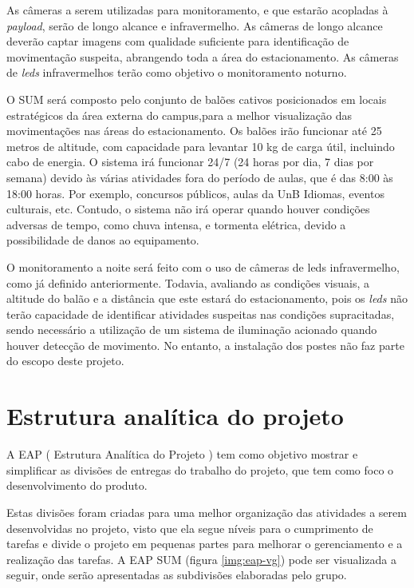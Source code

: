   As câmeras a serem utilizadas para monitoramento, e que estarão acopladas à \emph{payload}, serão de longo alcance e infravermelho.  As câmeras de longo alcance deverão captar imagens com qualidade suficiente para identificação de movimentação suspeita, abrangendo toda a área do estacionamento. As câmeras de \emph{leds} infravermelhos terão como objetivo o monitoramento noturno.

  O SUM será composto pelo conjunto de balões cativos posicionados em locais estratégicos da área externa do campus,para a melhor visualização das movimentações nas áreas do estacionamento. Os balões irão funcionar até 25 metros de altitude, com capacidade para levantar 10 kg de carga útil, incluindo cabo de energia. O sistema irá funcionar 24/7 (24 horas por dia, 7 dias por semana) devido às várias atividades fora do período de aulas, que é das 8:00 às 18:00 horas. Por exemplo, concursos públicos, aulas da UnB Idiomas, eventos culturais, etc. Contudo, o sistema não irá operar quando houver condições adversas de tempo, como chuva intensa, e tormenta elétrica, devido a possibilidade de danos ao equipamento.

  O monitoramento a noite será feito com o uso de câmeras de leds infravermelho, como já definido anteriormente. Todavia, avaliando as condições visuais, a altitude do balão e a distância que este estará do estacionamento, pois os \emph{leds} não terão capacidade  de identificar atividades suspeitas nas condições supracitadas, sendo necessário a utilização de um sistema de iluminação acionado quando houver detecção de movimento. No entanto, a instalação dos postes não faz parte do escopo deste projeto.

\section{Estrutura analítica do projeto}

A EAP   ( Estrutura Analítica do Projeto ) tem como objetivo  mostrar e simplificar as divisões de entregas do trabalho do projeto, que tem como foco  o desenvolvimento do produto.

Estas divisões foram criadas para uma melhor organização das atividades a serem desenvolvidas no projeto, visto que ela segue níveis para o cumprimento de tarefas  e  divide o projeto em pequenas partes para melhorar o gerenciamento e a realização das tarefas. A EAP SUM (figura \ref{img:eap-vg}) pode ser visualizada a seguir, onde serão apresentadas as subdivisões elaboradas pelo grupo.


